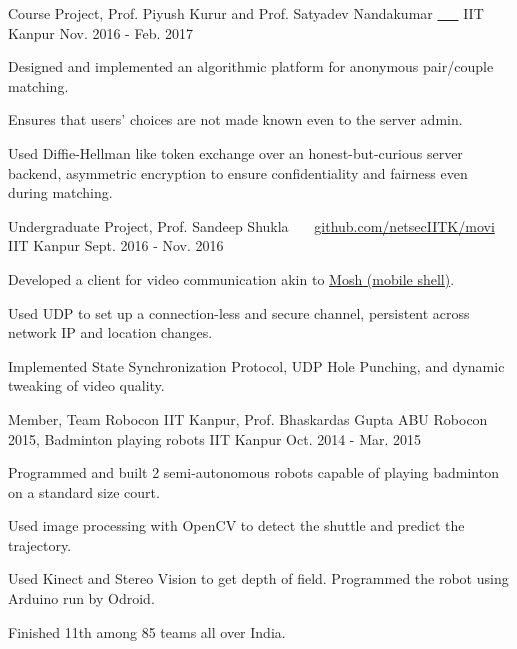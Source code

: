 \begin{cventries}
  \cventry
  {Course Project, Prof. Piyush Kurur and
    Prof. Satyadev Nandakumar}
  {\href{https://github.com/pclubiitk/puppy-love}{
      \ \ \ }}
  {IIT Kanpur}
  {Nov. 2016 - Feb. 2017}
  {
    \begin{cvitems}
      \item Designed and implemented an algorithmic platform
        for anonymous pair/couple matching.
      \item Ensures that users' choices are not made known even to the
        server admin.
      \item Used Diffie-Hellman like token exchange over an
        honest-but-curious server backend, asymmetric encryption to
        ensure confidentiality and fairness even during matching.
    \end{cvitems}
  }

  \cventry
  {Undergraduate Project, Prof. Sandeep Shukla}
  {\href{https://github.com/netsecIITK/moVi}{}
    \ \ \ \normalfont\href{https://github.com/netsecIITK/moVi}
    {github.com/netsecIITK/movi}}
  {IIT Kanpur}
  {Sept. 2016 - Nov. 2016}
  {
    \begin{cvitems}
    \item Developed a client for video communication
      akin to \href{https://mosh.org/}{Mosh (mobile shell)}.
    \item Used UDP to set up a connection-less and secure channel,
      persistent across network IP and location changes.
    \item Implemented State Synchronization Protocol, UDP Hole
      Punching, and dynamic tweaking of video quality.
    \end{cvitems}
  }

  \cventry
  {Member, Team Robocon IIT Kanpur, Prof. Bhaskardas Gupta}
  {ABU Robocon 2015, Badminton playing robots}
  {IIT Kanpur}
  {Oct. 2014 - Mar. 2015}
  {
    \begin{cvitems}
    \item Programmed and built 2 semi-autonomous robots
      capable of playing badminton on a standard size court.
    \item Used image processing with OpenCV to detect the shuttle
      and predict the trajectory.
    \item Used Kinect and Stereo Vision to get depth of
      field. Programmed the robot using Arduino run by Odroid.
    \item Finished 11th among 85 teams all over India.
    \end{cvitems}
  }

\end{cventries}


